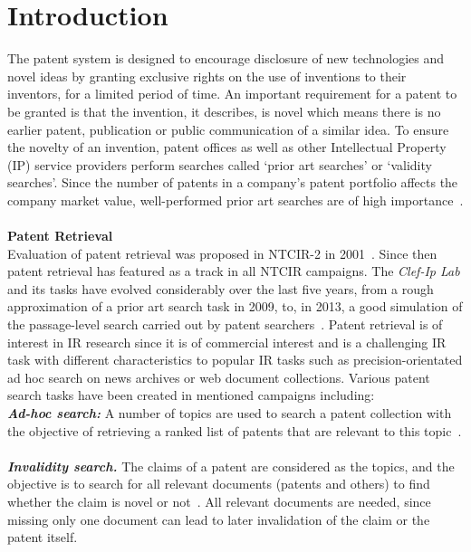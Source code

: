 \chapter{Introduction}
\label{cha:intro}
The patent system is designed to encourage disclosure of new technologies and novel ideas by granting exclusive rights on the use of inventions to their inventors, for a limited period of time. An important requirement for a patent to be granted is that the invention, it describes, is novel which means there is no earlier patent, publication or public communication of a similar idea. To ensure the novelty of an invention, patent offices as well as other Intellectual Property (IP) service providers perform searches called ‘prior art searches’ or ‘validity searches’. Since the number of patents in a company's patent portfolio affects the company market value, well-performed prior art searches are of high importance~\citep{piroi2013overview}.\\\\
\noindent
\textbf{Patent Retrieval }
\ \\
Evaluation of patent retrieval was proposed in NTCIR-2 in 2001~\citep{leong2001patent}. Since then patent retrieval has featured as a track in all NTCIR campaigns. The \emph{Clef-Ip Lab} and its tasks have evolved considerably over the last five years, from a rough approximation of a prior art search task in 2009, to, in 2013, a good simulation of the passage-level search carried out by patent searchers~\citep{piroi2013passage}. Patent retrieval is of interest in IR research since it is of commercial interest and is a challenging IR task with different characteristics to popular IR tasks such as precision-orientated ad hoc search on news archives or web document collections. Various patent search tasks have been created in mentioned campaigns including:
\\
\textbf{\textit{Ad-hoc search:}} A number of topics are used to search a patent collection with the objective of retrieving a ranked list of patents that are relevant to this topic~\citep{iwayama2003overview}.\\\\
\textbf{\textit{Invalidity search.}} The claims of a patent are considered as the topics, and the objective is to search for all relevant documents (patents and others) to find whether the claim is novel or not~\citep{joho2010survey, fujii2004overview}. All relevant documents are needed, since missing only one document can lead to later invalidation of the claim or the patent itself.
